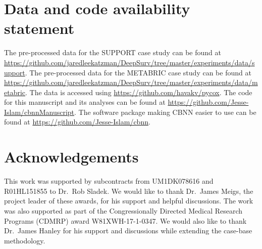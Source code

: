 \documentclass[AMA,STIX1COL,]{WileyNJD-v2}
\begin{document}
\hypertarget{data-and-code-availability-statement}{%
\section*{Data and code availability
statement}\label{data-and-code-availability-statement}}

The pre-processed data for the SUPPORT case study can be found at
\url{https://github.com/jaredleekatzman/DeepSurv/tree/master/experiments/data/support}.
The pre-processed data for the METABRIC case study can be found at
\url{https://github.com/jaredleekatzman/DeepSurv/tree/master/experiments/data/metabric}.
The data is accessed using \url{https://github.com/havakv/pycox}. The
code for this manuscript and its analyses can be found at
\url{https://github.com/Jesse-Islam/cbnnManuscript}. The software
package making CBNN easier to use can be found at
\url{https://github.com/Jesse-Islam/cbnn}.

\hypertarget{acknowledgements}{%
\section*{Acknowledgements}\label{acknowledgements}}

This work was supported by subcontracts from UM1DK078616 and R01HL151855
to Dr.~Rob Sladek. We would like to thank Dr.~James Meigs, the project
leader of these awards, for his support and helpful discussions. The
work was also supported as part of the Congressionally Directed Medical
Research Programs (CDMRP) award W81XWH-17-1-0347. We would also like to
thank Dr.~James Hanley for his support and discussions while extending
the case-base methodology.


\end{document}
